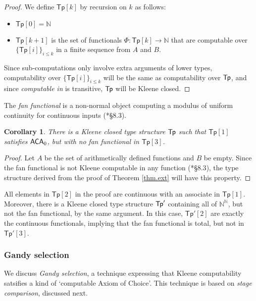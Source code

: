 \documentclass[reqno]{amsart}
\newtheorem{corollary}[thm]{Corollary}
\def\N{{\mathbb  N}}
\def\ACA{\textup{\textsf{ACA}}}
\def\TP{\textup{\textsf{Tp}}}
\newcommand{\Tp}{\mathsf{Tp}}
\numberwithin{equation}{section}
\numberwithin{thm}{section}
\begin{document}
\begin{proof} We define $\Tp[k]$ by recursion on $k$ as follows:
\begin{itemize}
\item $\Tp[0] = \N$
\item $\Tp[k+1]$ is the set of functionals $\Phi:\Tp[k] \rightarrow \N$ that are computable over $\{\Tp[i]\}_{i \leq k}$ in a finite sequence from $A$ and $B$. 
\end{itemize}
Since sub-computations only involve extra arguments of lower types, computability over $\{\Tp[i]\}_{i \leq k}$ will be the same as computability over $\TP$, and since \emph{computable in} is transitive, $\TP$ will be Kleene closed. 
\end{proof}
The \emph{fan functional} is a non-normal object computing a modulus of uniform continuity for continuous inputs (\cite{longmann}*{\S8.3}).  

\begin{corollary} 
There is a Kleene closed type structure $\TP$ such that $\Tp[1]$ satisfies $\ACA_0$, but with no fan functional in $\Tp[3]$.
\end{corollary}
\begin{proof} Let $A$ be the set of arithmetically defined functions and $B$ be empty. Since the fan functional is not Kleene computable in any function (\cite{longmann}*{\S8.3}), the type structure derived from the proof of Theorem \ref{thm.ext} will have this property. 
\end{proof}
All elements in $\Tp[2]$ in the proof are continuous with an associate in $\Tp[1]$.  
Moreover, there is a Kleene closed type structure $\TP'$ containing all of $\N^\N$, but not the fan functional, by the same argument.
In this case, $\Tp'[2]$ are exactly the continuous functionals, implying that the fan functional is total, but not in $\Tp'[3]$.

\subsubsection{Gandy selection}\label{xnx}
We discuss \emph{Gandy selection}, a technique expressing that Kleene computability satsifies a kind of `computable Axiom of Choice'.  
This technique is based on \emph{stage comparison}, discussed next. 

\smallskip
\end{document}
